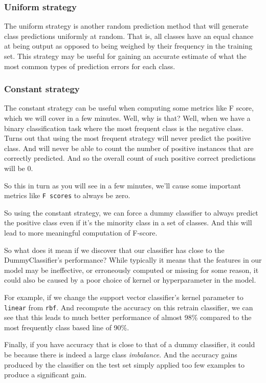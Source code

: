 \begin{multicols}{2}
\subsubsection*{Uniform strategy}

The uniform strategy is another random prediction method that will generate class predictions uniformly at random. That is, all classes have an equal chance at being output as opposed to being weighed by their frequency in the training set. This strategy may be useful for gaining an accurate estimate of what the most common types of prediction errors for each class. 

\subsubsection*{Constant strategy}

The constant strategy can be useful when computing some metrics like F score, which we will cover in a few minutes. Well, why is that? Well, when we have a binary classification task where the most frequent class is the negative class. Turns out that using the most frequent strategy will never predict the positive class. And will never be able to count the number of positive instances that are correctly predicted. And so the overall count of such positive correct predictions will be 0. 

So this in turn as you will see in a few minutes, we'll cause some important metrics like \texttt{F scores} to always be zero. 

So using the constant strategy, we can force a dummy classifier to always predict the positive class even if it's the minority class in a set of classes. And this will lead to more meaningful computation of F-score. 

So what does it mean if we discover that our classifier has close to the DummyClassifier's performance? While typically it means that the features in our model may be ineffective, or erroneously computed or missing for some reason, it could also be caused by a poor choice of kernel or hyperparameter in the model. 

For example, if we change the support vector classifier's kernel parameter to \texttt{linear} from \texttt{rbf}. And recompute the accuracy on this retrain classifier, we can see that this leads to much better performance of almost 98\% compared to the most frequently class based line of 90\%. 

Finally, if you have accuracy that is close to that of a dummy classifier, it could be because there is indeed a large class \emph{imbalance}. And the accuracy gains produced by the classifier on the test set simply applied too few examples to produce a significant gain. 


\end{multicols}
